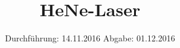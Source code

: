 

\subject{V61}
\title{HeNe-Laser}
\date{
  Durchführung: 14.11.2016
  \hspace{3em}
  Abgabe: 01.12.2016
}



\maketitle
\thispagestyle{empty}
\tableofcontents
\newpage






\printbibliography


